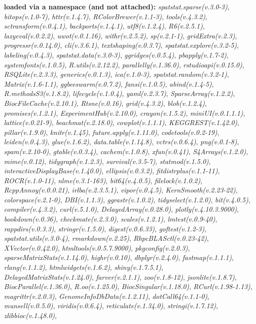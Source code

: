 \documentclass[
]{book}
\begin{document}
\textbf{loaded via a namespace (and not attached):}
\emph{spatstat.sparse(v.3.0-3)}, \emph{bitops(v.1.0-7)}, \emph{httr(v.1.4.7)}, \emph{RColorBrewer(v.1.1-3)}, \emph{tools(v.4.3.2)}, \emph{sctransform(v.0.4.1)}, \emph{backports(v.1.4.1)}, \emph{utf8(v.1.2.4)}, \emph{R6(v.2.5.1)}, \emph{lazyeval(v.0.2.2)}, \emph{uwot(v.0.1.16)}, \emph{withr(v.2.5.2)}, \emph{sp(v.2.1-1)}, \emph{gridExtra(v.2.3)}, \emph{progressr(v.0.14.0)}, \emph{cli(v.3.6.1)}, \emph{textshaping(v.0.3.7)}, \emph{spatstat.explore(v.3.2-5)}, \emph{labeling(v.0.4.3)}, \emph{spatstat.data(v.3.0-3)}, \emph{ggridges(v.0.5.4)}, \emph{pbapply(v.1.7-2)}, \emph{systemfonts(v.1.0.5)}, \emph{R.utils(v.2.12.2)}, \emph{parallelly(v.1.36.0)}, \emph{rstudioapi(v.0.15.0)}, \emph{RSQLite(v.2.3.3)}, \emph{generics(v.0.1.3)}, \emph{ica(v.1.0-3)}, \emph{spatstat.random(v.3.2-1)}, \emph{Matrix(v.1.6-1.1)}, \emph{ggbeeswarm(v.0.7.2)}, \emph{fansi(v.1.0.5)}, \emph{abind(v.1.4-5)}, \emph{R.methodsS3(v.1.8.2)}, \emph{lifecycle(v.1.0.4)}, \emph{yaml(v.2.3.7)}, \emph{SparseArray(v.1.2.2)}, \emph{BiocFileCache(v.2.10.1)}, \emph{Rtsne(v.0.16)}, \emph{grid(v.4.3.2)}, \emph{blob(v.1.2.4)}, \emph{promises(v.1.2.1)}, \emph{ExperimentHub(v.2.10.0)}, \emph{crayon(v.1.5.2)}, \emph{miniUI(v.0.1.1.1)}, \emph{lattice(v.0.21-9)}, \emph{beachmat(v.2.18.0)}, \emph{cowplot(v.1.1.1)}, \emph{KEGGREST(v.1.42.0)}, \emph{pillar(v.1.9.0)}, \emph{knitr(v.1.45)}, \emph{future.apply(v.1.11.0)}, \emph{codetools(v.0.2-19)}, \emph{leiden(v.0.4.3)}, \emph{glue(v.1.6.2)}, \emph{data.table(v.1.14.8)}, \emph{vctrs(v.0.6.4)}, \emph{png(v.0.1-8)}, \emph{spam(v.2.10-0)}, \emph{gtable(v.0.3.4)}, \emph{cachem(v.1.0.8)}, \emph{xfun(v.0.41)}, \emph{S4Arrays(v.1.2.0)}, \emph{mime(v.0.12)}, \emph{tidygraph(v.1.2.3)}, \emph{survival(v.3.5-7)}, \emph{statmod(v.1.5.0)}, \emph{interactiveDisplayBase(v.1.40.0)}, \emph{ellipsis(v.0.3.2)}, \emph{fitdistrplus(v.1.1-11)}, \emph{ROCR(v.1.0-11)}, \emph{nlme(v.3.1-163)}, \emph{bit64(v.4.0.5)}, \emph{filelock(v.1.0.2)}, \emph{RcppAnnoy(v.0.0.21)}, \emph{irlba(v.2.3.5.1)}, \emph{vipor(v.0.4.5)}, \emph{KernSmooth(v.2.23-22)}, \emph{colorspace(v.2.1-0)}, \emph{DBI(v.1.1.3)}, \emph{ggrastr(v.1.0.2)}, \emph{tidyselect(v.1.2.0)}, \emph{bit(v.4.0.5)}, \emph{compiler(v.4.3.2)}, \emph{curl(v.5.1.0)}, \emph{DelayedArray(v.0.28.0)}, \emph{plotly(v.4.10.3.9000)}, \emph{bookdown(v.0.36)}, \emph{checkmate(v.2.3.0)}, \emph{scales(v.1.2.1)}, \emph{lmtest(v.0.9-40)}, \emph{rappdirs(v.0.3.3)}, \emph{stringr(v.1.5.0)}, \emph{digest(v.0.6.33)}, \emph{goftest(v.1.2-3)}, \emph{spatstat.utils(v.3.0-4)}, \emph{rmarkdown(v.2.25)}, \emph{RhpcBLASctl(v.0.23-42)}, \emph{XVector(v.0.42.0)}, \emph{htmltools(v.0.5.7.9000)}, \emph{pkgconfig(v.2.0.3)}, \emph{sparseMatrixStats(v.1.14.0)}, \emph{highr(v.0.10)}, \emph{dbplyr(v.2.4.0)}, \emph{fastmap(v.1.1.1)}, \emph{rlang(v.1.1.2)}, \emph{htmlwidgets(v.1.6.2)}, \emph{shiny(v.1.7.5.1)}, \emph{DelayedMatrixStats(v.1.24.0)}, \emph{farver(v.2.1.1)}, \emph{zoo(v.1.8-12)}, \emph{jsonlite(v.1.8.7)}, \emph{BiocParallel(v.1.36.0)}, \emph{R.oo(v.1.25.0)}, \emph{BiocSingular(v.1.18.0)}, \emph{RCurl(v.1.98-1.13)}, \emph{magrittr(v.2.0.3)}, \emph{GenomeInfoDbData(v.1.2.11)}, \emph{dotCall64(v.1.1-0)}, \emph{munsell(v.0.5.0)}, \emph{viridis(v.0.6.4)}, \emph{reticulate(v.1.34.0)}, \emph{stringi(v.1.7.12)}, \emph{zlibbioc(v.1.48.0)}, 
\end{document}
